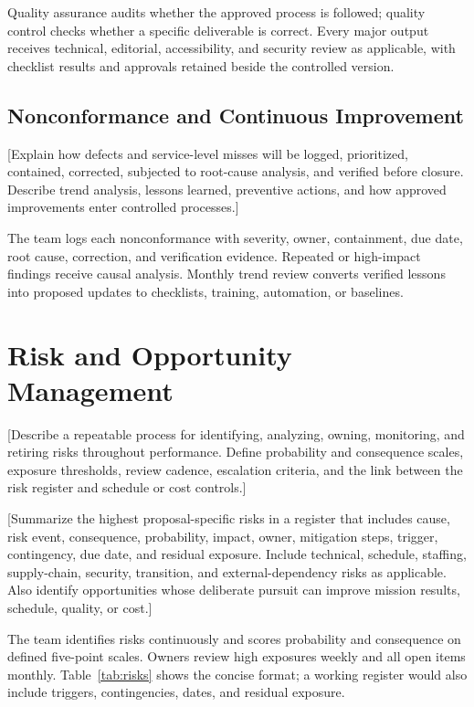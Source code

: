 Quality assurance audits whether the approved process is followed; quality
control checks whether a specific deliverable is correct. Every major output
receives technical, editorial, accessibility, and security review as applicable,
with checklist results and approvals retained beside the controlled version.

\subsection{Nonconformance and Continuous Improvement}
[Explain how defects and service-level misses will be logged, prioritized,
contained, corrected, subjected to root-cause analysis, and verified before
closure. Describe trend analysis, lessons learned, preventive actions, and how
approved improvements enter controlled processes.]

The team logs each nonconformance with severity, owner, containment, due date,
root cause, correction, and verification evidence. Repeated or high-impact
findings receive causal analysis. Monthly trend review converts verified lessons
into proposed updates to checklists, training, automation, or baselines.

\section{Risk and Opportunity Management}
\label{sec:risk}
[Describe a repeatable process for identifying, analyzing, owning, monitoring,
and retiring risks throughout performance. Define probability and consequence
scales, exposure thresholds, review cadence, escalation criteria, and the link
between the risk register and schedule or cost controls.]

[Summarize the highest proposal-specific risks in a register that includes
cause, risk event, consequence, probability, impact, owner, mitigation steps,
trigger, contingency, due date, and residual exposure. Include technical,
schedule, staffing, supply-chain, security, transition, and external-dependency
risks as applicable. Also identify opportunities whose deliberate pursuit can
improve mission results, schedule, quality, or cost.]

The team identifies risks continuously and scores probability and consequence
on defined five-point scales. Owners review high exposures weekly and all open
items monthly. Table~\ref{tab:risks} shows the concise format; a working register
would also include triggers, contingencies, dates, and residual exposure.

